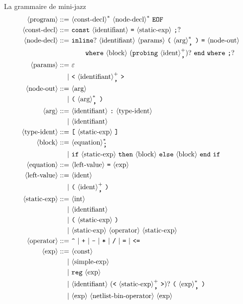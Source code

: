 \documentclass[a4paper]{article}
\DeclarePairedDelimiter{\scal}{\langle}{\rangle}
\newcommand{\nt}[1]{\ \scal*{\text{#1}}}
\newcommand{\te}[1]{\ \text{\texttt{#1}}}
\newcommand{\ite}[1]{\ \text{\texttt{#1}}\ }
\newcommand{\ste}[1]{\text{\large \texttt{#1}}}
\begin{document}
\noindent
La grammaire de mini-jazz
\begin{align*}
    \nt{program} ::= & \nt{const-decl}^* \nt{node-decl}^* \te{EOF} \\
    \nt{const-decl} ::= & \te{const} \nt{identifiant} \te{=} \nt{static-exp} \te{;}? \\
    \nt{node-decl} ::= & \te{inline}? \nt{identifiant} \nt{params} \te{(} \nt{arg}^*_\ste{,} \te{)} \te{=} \nt{node-out} \\
    & \qquad \te{where} \nt{block} \ (\!\!\te{probing} \nt{ident}^+_\ste{,})? \te{end} \te{where} \te{;}? \\
%
    \nt{params} ::= & \ \varepsilon \\
    | & \te{<} \nt{identifiant}^+_\ste{,} \te{>} \\
    \nt{node-out} ::= & \nt{arg} \\
    | & \te{(} \nt{arg}^*_\ste{,} \te{)} \\
    \nt{arg} ::= & \nt{identifiant} \te{:} \nt{type-ident} \\
    | & \nt{identifiant} \\
    \nt{type-ident} ::= & \te{[} \nt{static-exp} \te{]} \\
%
    \nt{block} ::= & \nt{equation}^*_\ste{;} \\
    | & \te{if} \nt{static-exp} \te{then} \nt{block} \te{else} \nt{block} \te{end} \te{if} \\
    \nt{equation} ::= & \nt{left-value} \te{=} \nt{exp} \\
    \nt{left-value} ::= & \nt{ident} \\
    | & \te{(} \nt{ident}^+_\ste{,} \te{)} \\
%
    \nt{static-exp} ::= & \nt{int} \\
    | & \nt{identifiant} \\
    | & \te{(} \nt{static-exp} \te{)} \\
    | & \nt{static-exp} \nt{operator} \nt{static-exp} \\
    \nt{operator} ::= & \ite{\textasciicircum} | \ite{+} | \ite{-} | \ite{*} | \ite{/} | \ite{=} | \ite{<=} \\
%
    \nt{exp} ::= & \nt{const} \\
    | & \nt{simple-exp} \\
    | & \te{reg} \nt{exp} \\
    | & \nt{identifiant}\ (\!\!\te{<} \nt{static-exp}^+_\ste{,} \te{>})? \te{(} \nt{exp}^*_\ste{,} \te{)} \\
    | & \nt{exp} \nt{netlist-bin-operator} \nt{exp} \\

\end{align*}
\end{document}
